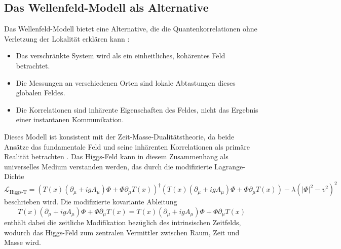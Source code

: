 \documentclass[12pt,a4paper]{article}
\newcommand{\DhiggsT}{T(x) (\partial_\mu + igA_\mu)\Phi + \Phi \partial_\mu T(x)}
\begin{document}
	\subsection{Das Wellenfeld-Modell als Alternative}
	Das Wellenfeld-Modell bietet eine Alternative, die die Quantenkorrelationen ohne Verletzung der Lokalität erklären kann \cite{Bohm1980}:
	\begin{itemize}
		\item Das verschränkte System wird als ein einheitliches, kohärentes Feld betrachtet.
		\item Die Messungen an verschiedenen Orten sind lokale Abtastungen dieses globalen Feldes.
		\item Die Korrelationen sind inhärente Eigenschaften des Feldes, nicht das Ergebnis einer instantanen Kommunikation.
	\end{itemize}
	Dieses Modell ist konsistent mit der Zeit-Masse-Dualitätstheorie, da beide Ansätze das fundamentale Feld und seine inhärenten Korrelationen als primäre Realität betrachten \cite{Pascher2024}. Das Higgs-Feld kann in diesem Zusammenhang als universelles Medium verstanden werden, das durch die modifizierte Lagrange-Dichte
	\begin{equation}
		\mathcal{L}_{\text{Higgs-T}} = (\DhiggsT)^\dagger (\DhiggsT) - \lambda(|\Phi|^2 - v^2)^2
	\end{equation}
	beschrieben wird. Die modifizierte kovariante Ableitung
	\begin{equation}
		\DhiggsT = T(x) (\partial_\mu + igA_\mu)\Phi + \Phi \partial_\mu T(x)
	\end{equation}
	enthält dabei die zeitliche Modifikation bezüglich des intrinsischen Zeitfelds, wodurch das Higgs-Feld zum zentralen Vermittler zwischen Raum, Zeit und Masse wird.
	
\end{document}
